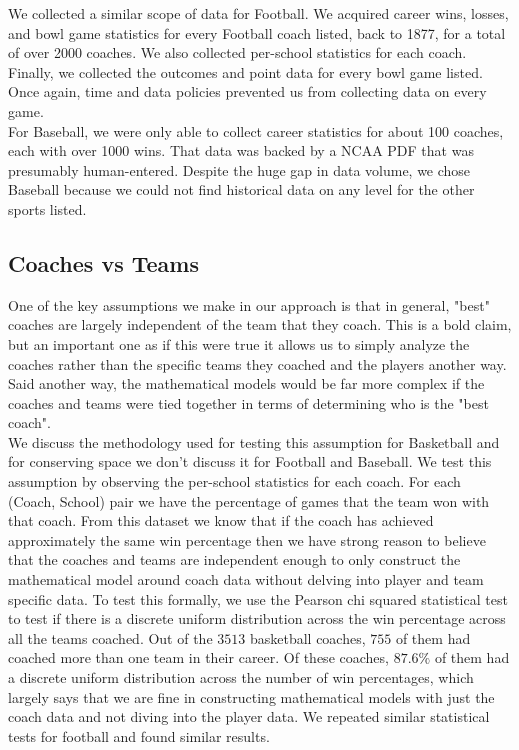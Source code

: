 \documentclass[11pt,notitlepage]{article}
\begin{document}
\noindent We collected a similar scope of data for Football. We acquired career wins, losses, and bowl game statistics for every Football coach listed, back to 1877, for a total of over 2000 coaches. We also collected per-school statistics for each coach. Finally, we collected the outcomes and point data for every bowl game listed. Once again, time and data policies prevented us from collecting data on every game.
\\

\noindent For Baseball, we were only able to collect career statistics for about 100 coaches, each with over 1000 wins.\cite{based} That data was backed by a NCAA PDF \cite{NCAAPDF} that was presumably human-entered. Despite the huge gap in data volume, we chose Baseball because we could not find historical data on any level for the other sports listed.

\subsection{Coaches vs Teams}

One of the key assumptions we make in our approach is that in general, "best" coaches are largely independent of the team that they coach. This is a bold claim, but an important one as if this were true it allows us to simply analyze the coaches rather than the specific teams they coached and the players another way. Said another way, the mathematical models would be far more complex if the coaches and teams were tied together in terms of determining who is the "best coach". 
\\

\noindent We discuss the methodology used for testing this assumption for Basketball and for conserving space we don't discuss it for Football and Baseball. We test this assumption by observing the per-school statistics for each coach. For each (Coach, School) pair we have the percentage of games that the team won with that coach. From this dataset we know that if the coach has achieved approximately the same win percentage then we have strong reason to believe that the coaches and teams are independent enough to only construct the mathematical model around coach data without delving into player and team specific data. To test this formally, we use the Pearson chi squared statistical test to test if there is a discrete uniform distribution across the win percentage across all the teams coached. Out of the $3513$ basketball coaches, $755$ of them had coached more than one team in their career. Of these coaches, $87.6\%$ of them had a discrete uniform distribution across the number of win percentages, which largely says that we are fine in constructing mathematical models with just the coach data and not diving into the player data. We repeated similar statistical tests for football and found similar results.
\end{document}

